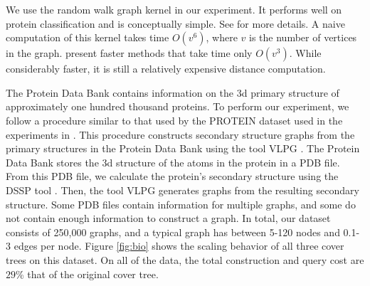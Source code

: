 \documentclass[thesis.tex]{subfiles}
\begin{document}
We use the random walk graph kernel in our experiment.
It performs well on protein classification and is conceptually simple.
See \citet{Vishwanathan2010} for more details.
A naive computation of this kernel takes time $O(v^6)$, where $v$ is the number of vertices in the graph.
\citet{Vishwanathan2010} present faster methods that take time only $O(v^3)$.
While considerably faster, it is still a relatively expensive distance computation.

The Protein Data Bank \cite{Berman2000} contains information on the 3d primary structure of approximately one hundred thousand proteins.
To perform our experiment, we follow a procedure similar to that used by the PROTEIN dataset used in the experiments in \citet{Vishwanathan2010}.
This procedure constructs secondary structure graphs from the primary structures in the Protein Data Bank
using the tool VLPG \citep{Schfer2012}.
The Protein Data Bank stores the 3d structure of the atoms in the protein in a PDB file.
From this PDB file, we calculate the protein's secondary structure using the DSSP tool \citep{Joosten11}.
Then, the tool VLPG \citep{Schfer2012} generates graphs from the resulting secondary structure.
Some PDB files contain information for multiple graphs, and some do not contain enough information to construct a graph.
In total, our dataset consists of 250,000 graphs, and a typical graph has between 5-120 nodes and 0.1-3 edges per node.
Figure \ref{fig:bio} shows the scaling behavior of all three cover trees on this dataset.
On all of the data, the total construction and query cost are $29$\% that of the original cover tree.
\end{document}
